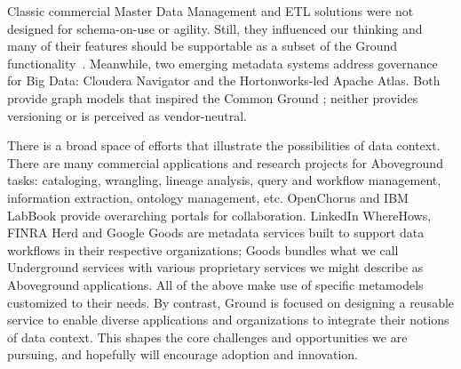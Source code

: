 \documentclass{sig-alternate}
\begin{document}
Classic commercial Master Data Management and ETL solutions were not designed for 
schema-on-use or agility. 
Still, they influenced our thinking and many of their features should be supportable as a subset of the Ground functionality~\cite{loshin2010master}.
Meanwhile,
two emerging metadata systems address governance for Big Data: Cloudera Navigator and the Hortonworks-led Apache Atlas. 
Both provide graph models that inspired the Common Ground \mantle; neither provides versioning or is perceived as vendor-neutral. %

There is a broad space of efforts that illustrate the possibilities of data context. 
There are many commercial applications and research projects for Aboveground tasks: cataloging, wrangling, lineage analysis, query and workflow management, information extraction, ontology management, etc. 
OpenChorus and IBM LabBook provide overarching portals for collaboration.
LinkedIn WhereHows, FINRA Herd and Google Goods are metadata services built to support data workflows in their respective organizations; Goods bundles what we call Underground services with various proprietary services we might describe as Aboveground applications.
All of the above make use of specific metamodels customized to their needs. By contrast, Ground is focused on designing a reusable service to enable diverse applications and organizations to integrate their notions 
of data context. 
This shapes the core challenges and opportunities we are pursuing, and hopefully will encourage adoption and innovation.


\end{document}
